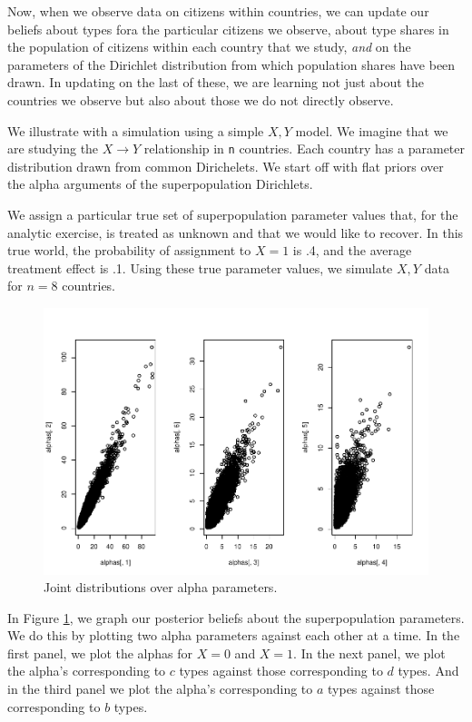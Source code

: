 \documentclass[
  12pt,
]{book}
\begin{document}
Now, when we observe data on citizens within countries, we can update our beliefs about types fora the particular citizens we observe, about type shares in the population of citizens within each country that we study, \emph{and} on the parameters of the Dirichlet distribution from which population shares have been drawn. In updating on the last of these, we are learning not just about the countries we observe but also about those we do not directly observe.

We illustrate with a simulation using a simple \(X,Y\) model. We imagine that we are studying the \(X \rightarrow Y\) relationship in \texttt{n} countries. Each country has a parameter distribution drawn from common Dirichelets. We start off with flat priors over the alpha arguments of the superpopulation Dirichlets.

We assign a particular true set of superpopulation parameter values that, for the analytic exercise, is treated as unknown and that we would like to recover. In this true world, the probability of assignment to \(X=1\) is .4, and the average treatment effect is .1. Using these true parameter values, we simulate \(X, Y\) data for \(n=8\) countries.

\begin{figure}
\centering
\includegraphics{ii_files/figure-latex/plotalphas-1.pdf}
\caption{\label{fig:plotalphas}Joint distributions over alpha parameters.}
\end{figure}

In Figure \ref{fig:plotalphas}, we graph our posterior beliefs about the superpopulation parameters. We do this by plotting two alpha parameters against each other at a time. In the first panel, we plot the alphas for \(X=0\) and \(X=1\). In the next panel, we plot the alpha's corresponding to \(c\) types against those corresponding to \(d\) types. And in the third panel we plot the alpha's corresponding to \(a\) types against those corresponding to \(b\) types.
\end{document}
